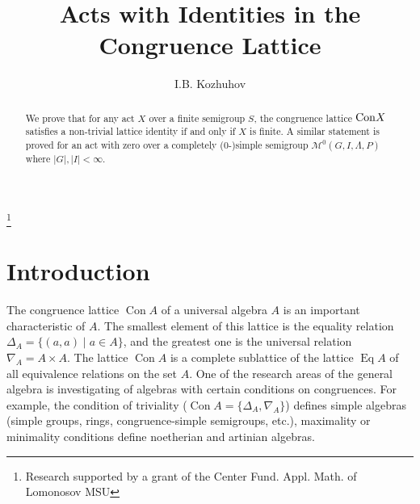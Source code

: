\documentclass{birkau}
\numberwithin{equation}{section}
\theoremstyle{plain}
\theoremstyle{definition}
\DeclareMathOperator{\Con}{Con}
\DeclareMathOperator{\Eq}{Eq}
\begin{document}
	
    \title[Acts with Identities in the Congruence Lattice]{Acts with Identities in the Congruence Lattice}

    \author[I.B. Kozhuhov]{I.B. Kozhuhov}
    \address{National Research University MIET, \\
    Faculty of Mechanics and Mathematics of Lomonosov Moscow State University, \\
    Center of Fundamental and Applied Mathematics of Lomonosov MSU \\
    Moscow\\Russia}

    \address{National Research University MIET\\Moscow\\Russia}
    
    \thanks{Research supported by a grant of the Center Fund. Appl. Math. of Lomonosov MSU}
	

    \begin{abstract}
    We prove that for any act $X$ over a finite semigroup $S$, the congruence lattice  ${\rm Con}X$ satisfies a non-trivial lattice identity if and only if $X$ is finite. A similar statement is proved for an act with zero over a completely (0-)simple semigroup $\mathcal M^0(G,I,\Lambda,P)$ where $|G|,|I| <\infty$.
    \end{abstract}
	
	\maketitle
	
	\section{Introduction}
	
	The congruence lattice $\Con A$ of a universal algebra $ A $ is an important characteristic of $A$. The smallest element of this lattice is the equality relation $ \Delta_A = \{ (a,a) \mid a \in A \} $, and the greatest one is the universal relation $ \nabla_A = A \times A $. The lattice $\Con A$ is a complete sublattice of the lattice $\Eq A$ of all equivalence relations on the set $A$.
    One of the research areas of the general algebra is investigating of algebras with certain conditions on congruences.	For example, the condition of triviality ($ \Con A = \{ \Delta_A, \nabla_A \} $) defines simple algebras (simple groups, rings, congruence-simple semigroups, etc.), maximality or minimality conditions define noetherian and artinian algebras.
	
\end{document}
